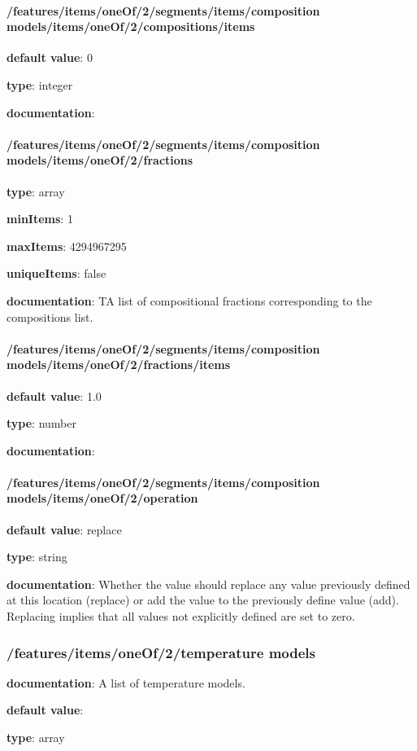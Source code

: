 \begin{itemized}
\paragraph{/features/items/oneOf/2/segments/items/composition models/items/oneOf/2/compositions/items} \begin{itemized}
\item {\bf default value}: 0
\item {\bf type}: integer
\item {\bf documentation}: 
\end{itemized}\end{itemized}\paragraph{/features/items/oneOf/2/segments/items/composition models/items/oneOf/2/fractions} \begin{itemized}
\item {\bf type}: array
\item {\bf minItems}: 1
\item {\bf maxItems}: 4294967295
\item {\bf uniqueItems}: false
\item {\bf documentation}: TA list of compositional fractions corresponding to the compositions list.
\paragraph{/features/items/oneOf/2/segments/items/composition models/items/oneOf/2/fractions/items} \begin{itemized}
\item {\bf default value}: 1.0
\item {\bf type}: number
\item {\bf documentation}: 
\end{itemized}\end{itemized}\paragraph{/features/items/oneOf/2/segments/items/composition models/items/oneOf/2/operation} \begin{itemized}
\item {\bf default value}: replace
\item {\bf type}: string
\item {\bf documentation}: Whether the value should replace any value previously defined at this location (replace) or add the value to the previously define value (add). Replacing implies that all values not explicitly defined are set to zero.
\end{itemized}\subsubsection{/features/items/oneOf/2/temperature models} \begin{itemized}
\item {\bf documentation}: A list of temperature models.
\item {\bf default value}: 
\item {\bf type}: array

\end{itemized}
